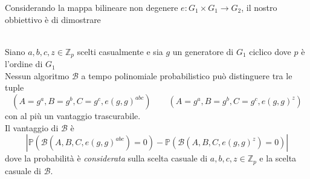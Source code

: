 \vspace{0.5cm}

Considerando la mappa bilineare non degenere $e:G_1 \times G_1 \rightarrow G_2$, il nostro obbiettivo è di dimostrare
\vspace{0.2cm}
\begin{assu}
\-\\Siano $a,b,c,z \in \mathbb{Z}_p$ scelti casualmente e sia $g$ un generatore di $G_1$ ciclico dove $p$ è l'ordine di $G_1$\\
Nessun algoritmo $\mathcal{B}$ a tempo polinomiale probabilistico può distinguere tra le tuple
\[ (A = g^a , B = g^b , C = g^c , e(g,g)^{abc}) \qquad (A = g^a , B = g^b , C = g^c , e(g,g)^{z}) \]
con al più un vantaggio trascurabile.\\
Il vantaggio di $\mathcal{B}$ è
\[ \left\lvert \mathbb{P}\left( \mathcal{B}(A,B,C,e(g,g)^{abc}) = 0 \right) - \mathbb{P}\left( \mathcal{B}(A,B,C,e(g,g)^{z}) = 0 \right) \right\rvert \]
dove la probabilità è \emph{considerata} sulla scelta casuale di $a,b,c,z \in \mathbb{Z}_p$ e la scelta casuale di $\mathcal{B}$.
\end{assu}